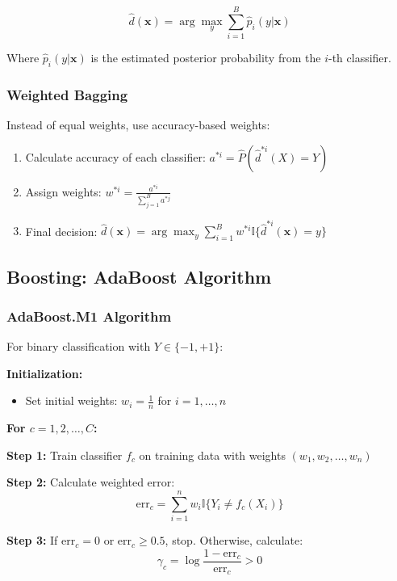 \documentclass[12pt,a4paper]{article}
\begin{document}
\begin{equation}
\hat{d}(\mathbf{x}) = \arg\max_y \sum_{i=1}^B \hat{p}_i(y|\mathbf{x})
\end{equation}

Where $\hat{p}_i(y|\mathbf{x})$ is the estimated posterior probability from the $i$-th classifier.

\subsubsection{Weighted Bagging}

Instead of equal weights, use accuracy-based weights:

\begin{enumerate}
    \item Calculate accuracy of each classifier: $a^{*i} = \hat{P}(\hat{d}^{*i}(X) = Y)$
    \item Assign weights: $w^{*i} = \frac{a^{*i}}{\sum_{j=1}^B a^{*j}}$
    \item Final decision: $\hat{d}(\mathbf{x}) = \arg\max_y \sum_{i=1}^B w^{*i} \mathbb{I}\{\hat{d}^{*i}(\mathbf{x}) = y\}$
\end{enumerate}

\subsection{Boosting: AdaBoost Algorithm}

\subsubsection{AdaBoost.M1 Algorithm}

For binary classification with $Y \in \{-1, +1\}$:

\textbf{Initialization:}
\begin{itemize}
    \item Set initial weights: $w_i = \frac{1}{n}$ for $i = 1, \ldots, n$
\end{itemize}

\textbf{For $c = 1, 2, \ldots, C$:}

\textbf{Step 1:} Train classifier $f_c$ on training data with weights $(w_1, w_2, \ldots, w_n)$

\textbf{Step 2:} Calculate weighted error:
\begin{equation}
\text{err}_c = \sum_{i=1}^n w_i \mathbb{I}\{Y_i \neq f_c(X_i)\}
\end{equation}

\textbf{Step 3:} If $\text{err}_c = 0$ or $\text{err}_c \geq 0.5$, stop. Otherwise, calculate:
\begin{equation}
\gamma_c = \log \frac{1 - \text{err}_c}{\text{err}_c} > 0
\end{equation}
\end{document}
